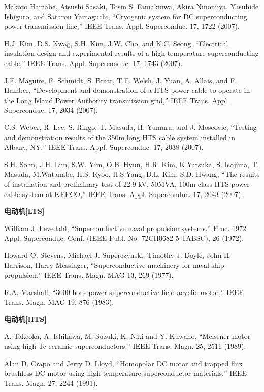 \noindent [9.197] Makoto Hamabe, Atsushi Sasaki, Tosin S. Famakinwa, Akira Ninomiya, Yasuhide
Ishiguro, and Satarou Yamaguchi, ``Cryogenic system for DC superconducting
power transmission line,” IEEE Trans. Appl. Superconduc. 17, 1722 (2007).

\noindent [9.198] H.J. Kim, D.S. Kwag, S.H. Kim, J.W. Cho, and K.C. Seong, ``Electrical insulation
design and experimental results of a high-temperature superconducting cable,”
IEEE Trans. Appl. Superconduc. 17, 1743 (2007).

\noindent [9.199] J.F. Maguire, F. Schmidt, S. Bratt, T.E. Welsh, J. Yuan, A. Allais, and F. Hamber,
``Development and demonstration of a HTS power cable to operate in the
Long Island Power Authority transmission grid,” IEEE Trans. Appl. Superconduc.
17, 2034 (2007).

\noindent [9.200] C.S. Weber, R. Lee, S. Ringo, T. Masuda, H. Yumura, and J. Moscovic, ``Testing
and demonstration results of the 350m long HTS cable system installed in Albany,
NY,” IEEE Trans. Appl. Superconduc. 17, 2038 (2007).

\noindent [9.201] S.H. Sohn, J.H. Lim, S.W. Yim, O.B. Hyun, H.R. Kim, K.Yatsuka, S. Isojima, T. Masuda, M.Watanabe, H.S. Ryoo, H.S.Yang, D.L. Kim, S.D. Hwang, ``The results
of installation and preliminary test of 22.9 kV, 50MVA, 100m class HTS
power cable system at KEPCO,” IEEE Trans. Appl. Superconduc. 17, 2043 (2007).

\noindent \textbf{电动机[LTS] }

\noindent [9.202] William J. Levedahl, ``Superconductive naval propulsion systems,” Proc. 1972
Appl. Superconduc. Conf. (IEEE Publ. No. 72CH0682-5-TABSC), 26 (1972).

\noindent [9.203] Howard O. Stevens, Michael J. Superczynski, Timothy J. Doyle, John H. Harrison,
Harry Messinger, ``Superconductive machinery for naval ship propulsion,” IEEE
Trans. Magn. MAG-13, 269 (1977).

\noindent [9.204] R.A. Marshall, ``3000 horsepower superconductive field acyclic motor,” IEEE
Trans. Magn. MAG-19, 876 (1983).

\noindent \textbf{电动机[HTS] }

\noindent [9.205] A. Takeoka, A. Ishikawa, M. Suzuki, K. Niki and Y. Kuwano, ``Meissner motor
using high-Tc ceramic superconductors,” IEEE Trans. Magn. 25, 2511 (1989).

\noindent [9.206] Alan D. Crapo and Jerry D. Lloyd, ``Homopolar DC motor and trapped flux
brushless DC motor using high temperature superconductor materials,” IEEE
Trans. Magn. 27, 2244 (1991).

